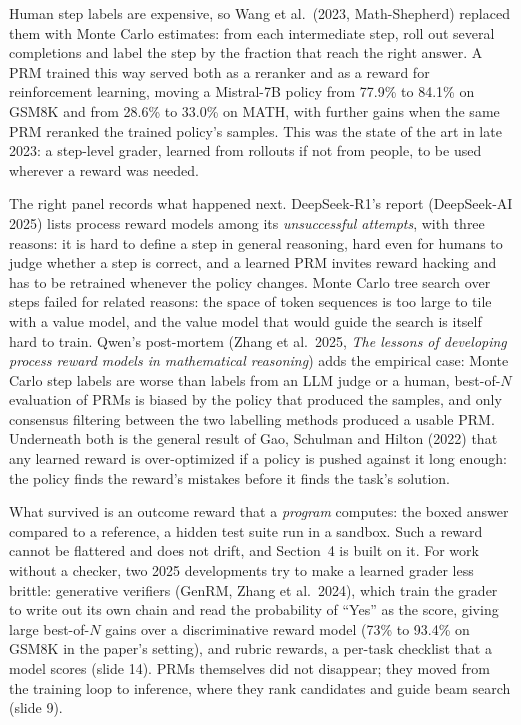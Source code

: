 \documentclass[11pt,letterpaper]{article}
\newcommand{\paper}[1]{\textit{#1}}
\begin{document}
Human step labels are expensive, so Wang et al.\ (2023, Math-Shepherd) replaced them with Monte Carlo estimates: from each intermediate step, roll out several completions and label the step by the fraction that reach the right answer. A PRM trained this way served both as a reranker and as a reward for reinforcement learning, moving a Mistral-7B policy from 77.9\% to 84.1\% on GSM8K and from 28.6\% to 33.0\% on MATH, with further gains when the same PRM reranked the trained policy's samples. This was the state of the art in late 2023: a step-level grader, learned from rollouts if not from people, to be used wherever a reward was needed.

The right panel records what happened next. DeepSeek-R1's report (DeepSeek-AI 2025) lists process reward models among its \emph{unsuccessful attempts}, with three reasons: it is hard to define a step in general reasoning, hard even for humans to judge whether a step is correct, and a learned PRM invites reward hacking and has to be retrained whenever the policy changes. Monte Carlo tree search over steps failed for related reasons: the space of token sequences is too large to tile with a value model, and the value model that would guide the search is itself hard to train. Qwen's post-mortem (Zhang et al.\ 2025, \paper{The lessons of developing process reward models in mathematical reasoning}) adds the empirical case: Monte Carlo step labels are worse than labels from an LLM judge or a human, best-of-$N$ evaluation of PRMs is biased by the policy that produced the samples, and only consensus filtering between the two labelling methods produced a usable PRM. Underneath both is the general result of Gao, Schulman and Hilton (2022) that any learned reward is over-optimized if a policy is pushed against it long enough: the policy finds the reward's mistakes before it finds the task's solution.

What survived is an outcome reward that a \emph{program} computes: the boxed answer compared to a reference, a hidden test suite run in a sandbox. Such a reward cannot be flattered and does not drift, and Section~4 is built on it. For work without a checker, two 2025 developments try to make a learned grader less brittle: generative verifiers (GenRM, Zhang et al.\ 2024), which train the grader to write out its own chain and read the probability of ``Yes'' as the score, giving large best-of-$N$ gains over a discriminative reward model (73\% to 93.4\% on GSM8K in the paper's setting), and rubric rewards, a per-task checklist that a model scores (slide 14). PRMs themselves did not disappear; they moved from the training loop to inference, where they rank candidates and guide beam search (slide 9).
\end{document}
